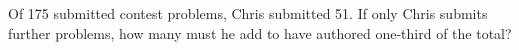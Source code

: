 Of 175 submitted contest problems, Chris submitted 51. If only Chris submits further problems, how many must he add to have authored one-third of the total?
